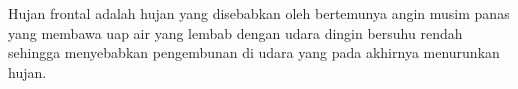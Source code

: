 Hujan frontal adalah hujan yang disebabkan oleh bertemunya angin musim panas yang membawa uap air yang lembab dengan udara dingin bersuhu rendah sehingga menyebabkan pengembunan di udara yang pada akhirnya menurunkan hujan.